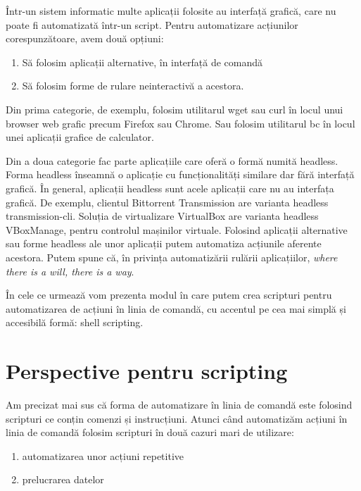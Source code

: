 Într-un sistem informatic multe aplicații folosite au interfață grafică, care nu
poate fi automatizată într-un script. Pentru automatizare acțiunilor
corespunzătoare, avem două opțiuni:

\begin{enumerate}
	\item Să folosim aplicații alternative, în interfață de comandă
	\item Să folosim forme de rulare neinteractivă a acestora.
\end{enumerate}

Din prima categorie, de exemplu, folosim utilitarul wget sau curl în locul unui
browser web grafic precum Firefox sau Chrome. Sau folosim utilitarul bc în locul
unei aplicații grafice de calculator.

Din a doua categorie fac parte aplicațiile care oferă o formă numită headless.
Forma headless înseamnă o aplicație cu funcționalități similare dar fără
interfață grafică. În general, aplicații headless sunt acele aplicații care nu
au interfața grafică. De exemplu, clientul Bittorrent Transmission are varianta
headless transmission-cli. Soluția de virtualizare VirtualBox are varianta
headless VBoxManage, pentru controlul mașinilor virtuale. Folosind aplicații
alternative sau forme headless ale unor aplicații putem automatiza acțiunile
aferente acestora. Putem spune că, în privința automatizării rulării
aplicațiilor, \textit{where there is a will, there is a way}.

În cele ce urmează vom prezenta modul în care putem crea scripturi pentru
automatizarea de acțiuni în linia de comandă, cu accentul pe cea mai simplă și
accesibilă formă: shell scripting.

\section{Perspective pentru scripting}
\label{sec:script-why}

Am precizat mai sus că forma de automatizare în linia de comandă este folosind
scripturi ce conțin comenzi și instrucțiuni. Atunci când automatizăm acțiuni în
linia de comandă folosim scripturi în două cazuri mari de utilizare:

\begin{enumerate}
	\item automatizarea unor acțiuni repetitive
	\item prelucrarea datelor
\end{enumerate}

